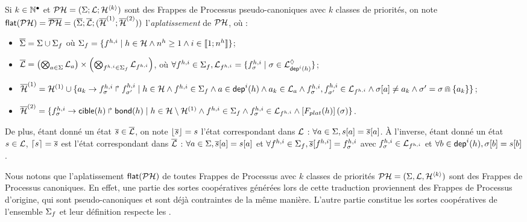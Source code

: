 \begin{definition}
  Si $k \in \mathbb{N}^\bullet$ et $\mathcal{PH} = (\Sigma; \mathcal{L}; \mathcal{H}^{{\langle k \rangle}})$
  sont des Frappes de Processus pseudo-canoniques avec $k$ classes de priorités,
  on note $\mathsf{flat}(\mathcal{PH}) = \overline{\mathcal{PH}} = (\overline{\Sigma}; \overline{\mathcal{L}}; (\overline{\mathcal{H}}^{(1)}; \overline{\mathcal{H}}^{(2)}))$
  l'\emph{aplatissement} de $\mathcal{PH}$, où :
  \begin{itemize}
    \item $\overline{\Sigma} = \Sigma \cup \Sigma_f$
      où $\Sigma_f = \{ f^{h,i} \mid h \in \mathcal{H} \wedge n^{h} \geq 1 \wedge i \in \llbracket 1; n^{h} \rrbracket \}$;
    \item $\overline{\mathcal{L}} = \left( \bigotimes_{a \in \Sigma} \mathcal{L}_{a} \right) \times
      \left(\bigotimes_{f^{h,i} \in \Sigma_f} \mathcal{L}_{f^{h,i}} \right)$, où
      $\forall f^{h,i} \in \Sigma_f, \mathcal{L}_{f^{h,i}} =
        \{ f^{h,i}_\sigma \mid \sigma \in \mathcal{L}^\lozenge_{\mathsf{dep}^{i}(h)} \}$;
    \item $\overline{\mathcal{H}}^{(1)} = \mathcal{H}^{(1)} \cup
      \{ a_k\rightarrow f^{h,i}_\sigma\Rsh f^{h,i}_{\sigma'} \mid
      h \in \mathcal{H} \wedge f^{h,i} \in \Sigma_f \wedge
      a \in \mathsf{dep}^{i}(h) \wedge a_k \in \mathcal{L}_a \wedge
      f^{h,i}_\sigma , f^{h,i}_{\sigma'} \in \mathcal{L}_{f^{h,i}} \wedge
      {\sigma[a]} \neq a_k \wedge \sigma' = \sigma \Cap \{ a_k \} \}$;
    \item $\overline{\mathcal{H}}^{(2)}=\{ f^{h,i}_\sigma\rightarrow\mathsf{cible}(h)\Rsh\mathsf{bond}(h) \mid
      h \in \mathcal{H} \setminus \mathcal{H}^{(1)} \wedge f^{h,i} \in \Sigma_f \wedge
      f^{h,i}_\sigma \in \mathcal{L}_{f^{h,i}} \wedge \left[F_{plat}(h)\right](\sigma) \}$.
  \end{itemize}
  De plus, étant donné un état $\overline{s} \in \overline{\mathcal{L}}$,
  on note $\lfloor \overline{s} \rfloor = s$ l'état correspondant dans $\mathcal{L}$ :
  $\forall a \in \Sigma, {s[a]} = {\overline{s}[a]}$.
  À l'inverse, étant donné un état $s \in \mathcal{L}$,
  $\lceil s \rceil = \overline{s}$ est l'état correspondant dans $\overline{\mathcal{L}}$ :
  $\forall a \in \Sigma, {\overline{s}[a]} = {s[a]}$
  et $\forall f^{h,i} \in \Sigma_f, {\overline{s}[f^{h,i}]} = f^{h,i}_\sigma$
  avec $f^{h,i}_\sigma \in \mathcal{L}_{f^{h,i}}$
  et $\forall b \in \mathsf{dep}^{i}(h), {\sigma[b]} = {s[b]}$.
\end{definition}

Nous notons que l'aplatissement $\mathsf{flat}(\mathcal{PH})$ de toutes Frappes de Processus avec $k$
classes de priorités $\mathcal{PH} = (\Sigma, \mathcal{L}, \mathcal{H}^{{\langle k \rangle}})$
sont des Frappes de Processus canoniques.
En effet, une partie des sortes coopératives générées lors de cette traduction proviennent
des Frappes de Processus d'origine, qui sont pseudo-canoniques et sont déjà contraintes de la
même manière.
L'autre partie constitue les sortes coopératives de l'ensemble $\Sigma_f$ et leur définition
respecte les \allcr.

